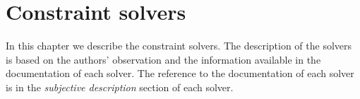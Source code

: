 \chapter{Constraint solvers}
\label{constraint-solvers}

In this chapter we describe the constraint solvers. The description of the solvers is
based on the authors' observation and the information available in the documentation
of each solver. The reference to the documentation of each solver is in the
{\em subjective description} section of each solver.














